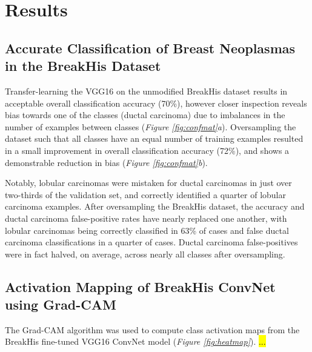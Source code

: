 \section{Results}

\subsection{Accurate Classification of Breast Neoplasmas in the BreakHis Dataset}

Transfer-learning the VGG16 on the unmodified BreakHis dataset results in acceptable overall classification accuracy (70\%), however closer inspection reveals bias towards one of the classes (ductal carcinoma) due to imbalances in the number of examples between classes (\emph{Figure \ref{fig:confmat}a}). Oversampling the dataset such that all classes have an equal number of training examples resulted in a small improvement in overall classification accuracy (72\%), and shows a demonstrable reduction in bias (\emph{Figure \ref{fig:confmat}b}).\par

Notably, lobular carcinomas were mistaken for ductal carcinomas in just over two-thirds of the validation set, and correctly identified a quarter of lobular carcinoma examples. After oversampling the BreakHis dataset, the accuracy and ductal carcinoma false-positive rates have nearly replaced one another, with lobular carcinomas being correctly classified in 63\% of cases and false ductal carcinoma classifications in a quarter of cases. Ductal carcinoma false-positives were in fact halved, on average, across nearly all classes after oversampling.\par

\subsection{Activation Mapping of BreakHis ConvNet using \mbox{Grad-CAM}}

The Grad-CAM algorithm was used to compute class activation maps from the BreakHis fine-tuned VGG16 ConvNet model (\emph{Figure \ref{fig:heatmap}}). \hl{...}



